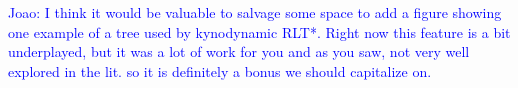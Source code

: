 \documentclass[letterpaper, 10 pt, conference]{ieeeconf}
\newcommand{\jm}[1]{\textcolor{blue}{Joao: #1}}
\begin{document}
\jm{I think it would be valuable to salvage some space to add a figure showing one example of a tree used by kynodynamic RLT*. Right now this feature is a bit underplayed, but it was a lot of work for you and as you saw, not very well explored in the lit. so it is definitely a bonus we should capitalize on.}






\end{document}
